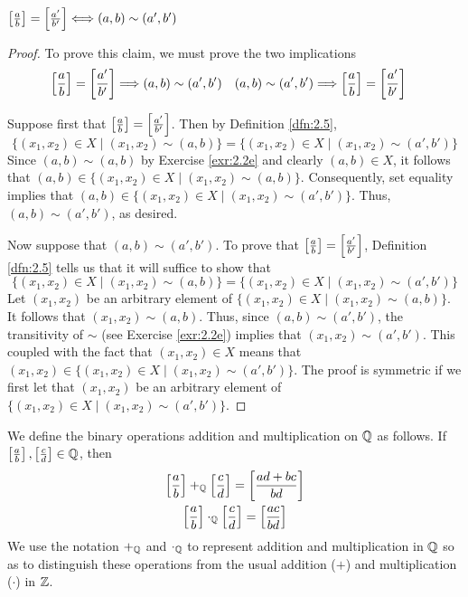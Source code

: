 \documentclass[../main.tex]{subfiles}
\begin{document}
\begin{exercise}\label{exr:2.6}
    $\left[ \frac{a}{b} \right]=\left[ \frac{a'}{b'} \right]\Longleftrightarrow(a,b)\sim(a',b')$
    \begin{proof}
        To prove this claim, we must prove the two implications
        \begin{align*}
            \left[ \frac{a}{b} \right]=\left[ \frac{a'}{b'} \right] &\Longrightarrow (a,b)\sim(a',b')&
            (a,b)\sim(a',b') &\Longrightarrow \left[ \frac{a}{b} \right]=\left[ \frac{a'}{b'} \right]
        \end{align*}\par
        Suppose first that $\left[ \frac{a}{b} \right]=\left[ \frac{a'}{b'} \right]$. Then by Definition \ref{dfn:2.5},
        \begin{equation*}
            \{(x_1,x_2)\in X\mid (x_1,x_2)\sim(a,b)\} = \{(x_1,x_2)\in X\mid (x_1,x_2)\sim(a',b')\}
        \end{equation*}
        Since $(a,b)\sim(a,b)$ by Exercise \ref{exr:2.2e} and clearly $(a,b)\in X$, it follows that $(a,b)\in\{(x_1,x_2)\in X\mid (x_1,x_2)\sim(a,b)\}$. Consequently, set equality implies that $(a,b)\in\{(x_1,x_2)\in X\mid (x_1,x_2)\sim(a',b')\}$. Thus, $(a,b)\sim(a',b')$, as desired.\par
        Now suppose that $(a,b)\sim(a',b')$. To prove that $\left[ \frac{a}{b} \right]=\left[ \frac{a'}{b'} \right]$, Definition \ref{dfn:2.5} tells us that it will suffice to show that
        \begin{equation*}
            \{(x_1,x_2)\in X\mid (x_1,x_2)\sim(a,b)\} = \{(x_1,x_2)\in X\mid (x_1,x_2)\sim(a',b')\}
        \end{equation*}
        Let $(x_1,x_2)$ be an arbitrary element of $\{(x_1,x_2)\in X\mid (x_1,x_2)\sim(a,b)\}$. It follows that $(x_1,x_2)\sim(a,b)$. Thus, since $(a,b)\sim(a',b')$, the transitivity of $\sim$ (see Exercise \ref{exr:2.2e}) implies that $(x_1,x_2)\sim(a',b')$. This coupled with the fact that $(x_1,x_2)\in X$ means that $(x_1,x_2)\in\{(x_1,x_2)\in X\mid (x_1,x_2)\sim(a',b')\}$. The proof is symmetric if we first let that $(x_1,x_2)$ be an arbitrary element of $\{(x_1,x_2)\in X\mid (x_1,x_2)\sim(a',b')\}$.
    \end{proof}
\end{exercise}

\begin{definition}\label{dfn:2.7}
    We define the binary operations addition and multiplication on $\mathbb{Q}$ as follows. If $\left[ \frac{a}{b} \right],\left[ \frac{c}{d} \right]\in\mathbb{Q}$, then
    \begin{gather*}
        \left[ \frac{a}{b} \right]+_{\mathbb{Q}}\left[ \frac{c}{d} \right] = \left[ \frac{ad+bc}{bd} \right]\\
        \left[ \frac{a}{b} \right]\cdot_{\mathbb{Q}}\left[ \frac{c}{d} \right] = \left[ \frac{ac}{bd} \right]
    \end{gather*}
    We use the notation $+_{\mathbb{Q}}$ and $\cdot_{\mathbb{Q}}$ to represent addition and multiplication in $\mathbb{Q}$ so as to distinguish these operations from the usual addition ($+$) and multiplication ($\cdot$) in $\mathbb{Z}$.
\end{definition}
\end{document}
